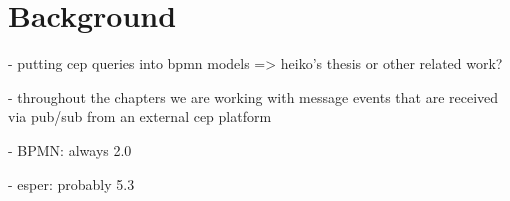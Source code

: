 \chapter{Background}\label{ch:background}

- putting cep queries into bpmn models => heiko's thesis or other related work?

- throughout the chapters we are working with message events that are received via pub/sub from an external cep platform

- BPMN: always 2.0

- esper: probably 5.3